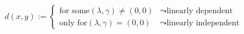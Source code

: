 \documentclass[preview]{standalone}
\begin{document}
\begin{align*}
d(x,y) := \begin{cases} \text{for some} (\lambda , \gamma) \neq (0,0) & \leadsto \text{linearly dependent} \\\text{only for} (\lambda , \gamma) = (0,0) & \leadsto \text{linearly independent}\end{cases}
\end{align*}
\end{document}
